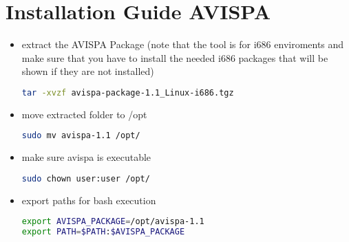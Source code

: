 \chapter{Installation Guide AVISPA}
\begin{itemize}
\item extract the AVISPA Package (note that the tool is for i686 enviroments and make sure that you have to install the needed i686 packages that will be shown if they are not installed)
\begin{lstlisting}[language=bash]
tar -xvzf avispa-package-1.1_Linux-i686.tgz
\end{lstlisting}
\item move extracted folder to /opt
\begin{lstlisting}[language=bash]
sudo mv avispa-1.1 /opt/
\end{lstlisting}
\item make sure avispa is executable
\begin{lstlisting}[language=bash]
sudo chown user:user /opt/
\end{lstlisting}
\item export paths for bash execution
\begin{lstlisting}[language=bash]
export AVISPA_PACKAGE=/opt/avispa-1.1
export PATH=$PATH:$AVISPA_PACKAGE
\end{lstlisting}
\end{itemize}